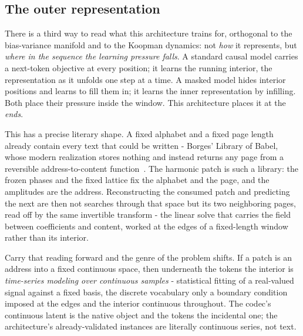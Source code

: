 \paperFramingHarmonic

\subsection{The outer representation}

There is a third way to read what this architecture trains for, orthogonal to the bias-variance manifold and to the Koopman dynamics: not \textit{how} it represents, but \textit{where in the sequence the learning pressure falls}. A standard causal model carries a next-token objective at every position; it learns the running interior, the representation as it unfolds one step at a time. A masked model hides interior positions and learns to fill them in; it learns the inner representation by infilling. Both place their pressure inside the window. This architecture places it at the \textit{ends}.

\paperFramingOuter

This has a precise literary shape. A fixed alphabet and a fixed page length already contain every text that could be written - Borges' Library of Babel, whose modern realization stores nothing and instead returns any page from a reversible address-to-content function~\cite{libraryofbabel}. The harmonic patch is such a library: the frozen phases and the fixed lattice fix the alphabet and the page, and the amplitudes are the address. Reconstructing the consumed patch and predicting the next are then not searches through that space but its two neighboring pages, read off by the same invertible transform - the linear solve that carries the field between coefficients and content, worked at the edges of a fixed-length window rather than its interior.

Carry that reading forward and the genre of the problem shifts. If a patch is an address into a fixed continuous space, then underneath the tokens the interior is \textit{time-series modeling over continuous samples} - statistical fitting of a real-valued signal against a fixed basis, the discrete vocabulary only a boundary condition imposed at the edges and the interior continuous throughout. The codec's continuous latent is the native object and the tokens the incidental one; the architecture's already-validated instances are literally continuous series, not text.

